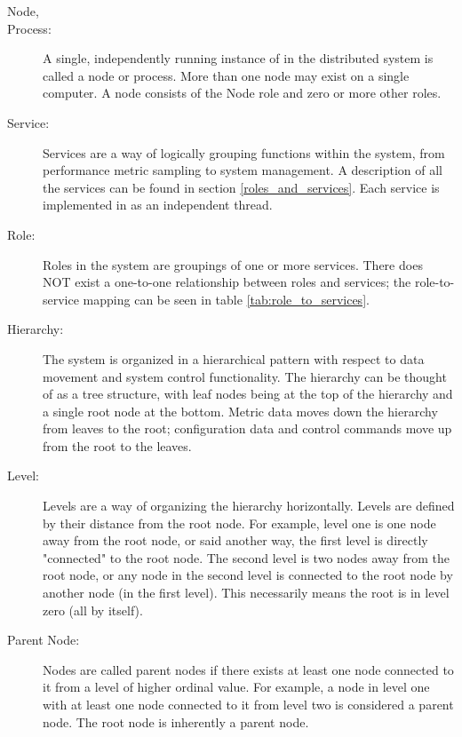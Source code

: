 \begin{description}
\item[\dcamp Node,]
\item[\dcamp Process:]
A single, independently running instance of \dcamp in the distributed system is called a \dcamp node or process. More
than one node may exist on a single computer. A node consists of the Node role and zero or more other \dcamp roles. 

\item[\dcamp Service:]
Services are a way of logically grouping functions within the \dcamp system, from performance metric sampling to \dcamp
system management. A description of all the \dcamp services can be found in section \ref{roles_and_services}. Each
service is implemented in \dcamp as an independent thread.

\item[\dcamp Role:]
Roles in the \dcamp system are groupings of one or more \dcamp services. There does NOT exist a one-to-one
relationship between roles and services; the \dcamp role-to-service mapping can be seen in table
\ref{tab:role_to_services}.

\item[\dcamp Hierarchy:]
The \dcamp system is organized in a hierarchical pattern with respect to data movement and system control functionality.
The hierarchy can be thought of as a tree structure, with leaf nodes being at the top of the hierarchy and a single root
node at the bottom. Metric data moves down the hierarchy from leaves to the root; configuration data and control
commands move up from the root to the leaves. 

\item[\dcamp Level:]
Levels are a way of organizing the \dcamp hierarchy horizontally. Levels are defined by their distance from the root
node. For example, level one is one node away from the root node, or said another way, the first level is directly
"connected" to the root node. The second level is two nodes away from the root node, or any node in the second level is
connected to the root node by another node (in the first level). This necessarily means the root is in level zero (all
by itself). 

\item[Parent Node:]
Nodes are called parent nodes if there exists at least one node connected to it from a level of higher ordinal value.
For example, a node in level one with at least one node connected to it from level two is considered a parent node. The
root node is inherently a parent node. 


\end{description}
